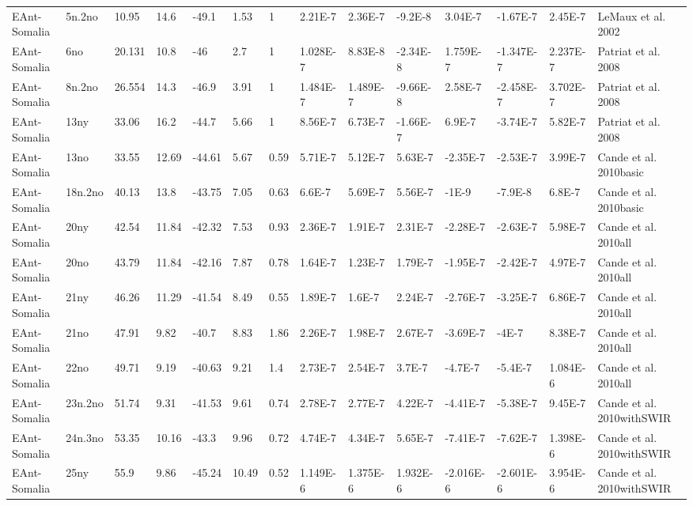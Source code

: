 \begin{landscape}
\begin{longtable}{@{}lllllllllllllp{3.5cm}@{}}
EAnt-Somalia & 5n.2no & 10.95 & 14.6 & -49.1 & 1.53 & 1 & 2.21E-7 & 2.36E-7 & -9.2E-8 & 3.04E-7 & -1.67E-7 & 2.45E-7 & LeMaux et al. 2002 \\
EAnt-Somalia & 6no & 20.131 & 10.8 & -46 & 2.7 & 1 & 1.028E-7 & 8.83E-8 & -2.34E-8 & 1.759E-7 & -1.347E-7 & 2.237E-7 & Patriat et al. 2008 \\
EAnt-Somalia & 8n.2no & 26.554 & 14.3 & -46.9 & 3.91 & 1 & 1.484E-7 & 1.489E-7 & -9.66E-8 & 2.58E-7 & -2.458E-7 & 3.702E-7 & Patriat et al. 2008 \\
EAnt-Somalia & 13ny & 33.06 & 16.2 & -44.7 & 5.66 & 1 & 8.56E-7 & 6.73E-7 & -1.66E-7 & 6.9E-7 & -3.74E-7 & 5.82E-7 & Patriat et al. 2008 \\
EAnt-Somalia & 13no & 33.55 & 12.69 & -44.61 & 5.67 & 0.59 & 5.71E-7 & 5.12E-7 & 5.63E-7 & -2.35E-7 & -2.53E-7 & 3.99E-7 & Cande et al. 2010basic \\
EAnt-Somalia & 18n.2no & 40.13 & 13.8 & -43.75 & 7.05 & 0.63 & 6.6E-7 & 5.69E-7 & 5.56E-7 & -1E-9 & -7.9E-8 & 6.8E-7 & Cande et al. 2010basic \\
EAnt-Somalia & 20ny & 42.54 & 11.84 & -42.32 & 7.53 & 0.93 & 2.36E-7 & 1.91E-7 & 2.31E-7 & -2.28E-7 & -2.63E-7 & 5.98E-7 & Cande et al. 2010all \\
EAnt-Somalia & 20no & 43.79 & 11.84 & -42.16 & 7.87 & 0.78 & 1.64E-7 & 1.23E-7 & 1.79E-7 & -1.95E-7 & -2.42E-7 & 4.97E-7 & Cande et al. 2010all \\
EAnt-Somalia & 21ny & 46.26 & 11.29 & -41.54 & 8.49 & 0.55 & 1.89E-7 & 1.6E-7 & 2.24E-7 & -2.76E-7 & -3.25E-7 & 6.86E-7 & Cande et al. 2010all \\
EAnt-Somalia & 21no & 47.91 & 9.82 & -40.7 & 8.83 & 1.86 & 2.26E-7 & 1.98E-7 & 2.67E-7 & -3.69E-7 & -4E-7 & 8.38E-7 & Cande et al. 2010all \\
EAnt-Somalia & 22no & 49.71 & 9.19 & -40.63 & 9.21 & 1.4 & 2.73E-7 & 2.54E-7 & 3.7E-7 & -4.7E-7 & -5.4E-7 & 1.084E-6 & Cande et al. 2010all \\
EAnt-Somalia & 23n.2no & 51.74 & 9.31 & -41.53 & 9.61 & 0.74 & 2.78E-7 & 2.77E-7 & 4.22E-7 & -4.41E-7 & -5.38E-7 & 9.45E-7 & Cande et al. 2010withSWIR \\
EAnt-Somalia & 24n.3no & 53.35 & 10.16 & -43.3 & 9.96 & 0.72 & 4.74E-7 & 4.34E-7 & 5.65E-7 & -7.41E-7 & -7.62E-7 & 1.398E-6 & Cande et al. 2010withSWIR \\
EAnt-Somalia & 25ny & 55.9 & 9.86 & -45.24 & 10.49 & 0.52 & 1.149E-6 & 1.375E-6 & 1.932E-6 & -2.016E-6 & -2.601E-6 & 3.954E-6 & Cande et al. 2010withSWIR \\

\end{longtable}
\end{landscape}
